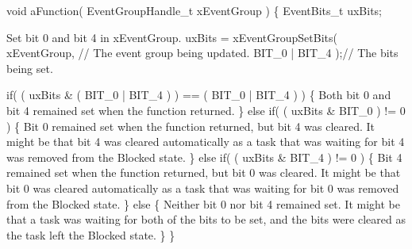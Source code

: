 \begin{DoxyPre}   void aFunction( EventGroupHandle\_t xEventGroup )
   \{
   EventBits\_t uxBits;\end{DoxyPre}



\begin{DoxyPre}Set bit 0 and bit 4 in xEventGroup.
        uxBits = xEventGroupSetBits(
                            xEventGroup,    // The event group being updated.
                            BIT\_0 | BIT\_4 );// The bits being set.\end{DoxyPre}



\begin{DoxyPre}        if( ( uxBits \& ( BIT\_0 | BIT\_4 ) ) == ( BIT\_0 | BIT\_4 ) )
        \{
Both bit 0 and bit 4 remained set when the function returned.
        \}
        else if( ( uxBits \& BIT\_0 ) != 0 )
        \{
Bit 0 remained set when the function returned, but bit 4 was
cleared.  It might be that bit 4 was cleared automatically as a
task that was waiting for bit 4 was removed from the Blocked
state.
        \}
        else if( ( uxBits \& BIT\_4 ) != 0 )
        \{
Bit 4 remained set when the function returned, but bit 0 was
cleared.  It might be that bit 0 was cleared automatically as a
task that was waiting for bit 0 was removed from the Blocked
state.
        \}
        else
        \{
Neither bit 0 nor bit 4 remained set.  It might be that a task
was waiting for both of the bits to be set, and the bits were
cleared as the task left the Blocked state.
        \}
   \}
   \end{DoxyPre}
 
